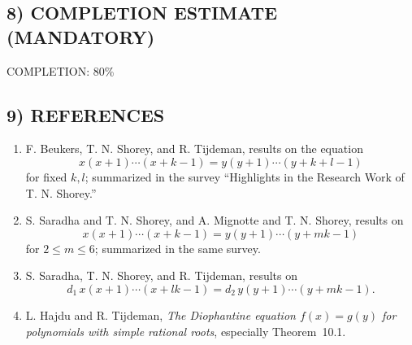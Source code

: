 \subsection*{8) COMPLETION ESTIMATE (MANDATORY)}

COMPLETION: 80\%

\subsection*{9) REFERENCES}

\begin{enumerate}
\item F. Beukers, T. N. Shorey, and R. Tijdeman, results on the equation
\[
x(x+1)\cdots(x+k-1)=y(y+1)\cdots(y+k+l-1)
\]
for fixed $k,l$; summarized in the survey ``Highlights in the Research Work of T. N. Shorey.''

\item S. Saradha and T. N. Shorey, and A. Mignotte and T. N. Shorey, results on
\[
x(x+1)\cdots(x+k-1)=y(y+1)\cdots(y+mk-1)
\]
for $2\le m\le 6$; summarized in the same survey.

\item S. Saradha, T. N. Shorey, and R. Tijdeman, results on
\[
d_1\,x(x+1)\cdots(x+lk-1)=d_2\,y(y+1)\cdots(y+mk-1).
\]

\item L. Hajdu and R. Tijdeman, \emph{The Diophantine equation $f(x)=g(y)$ for polynomials with simple rational roots}, especially Theorem~10.1.
\end{enumerate}



